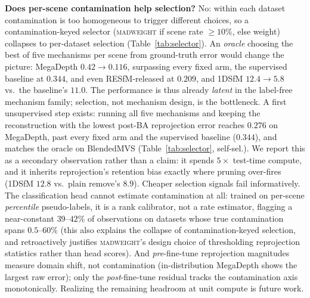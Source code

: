 \documentclass[10pt,twocolumn,letterpaper]{article}
\newcommand{\mad}{\textsc{madweight}}
\begin{document}
\noindent\textbf{Does per-scene contamination help selection?} No: within each dataset
contamination is too homogeneous to trigger different choices, so a contamination-keyed
selector (\mad{} if scene rate ${\ge}10\%$, else weight) collapses to per-dataset
selection (Table~\ref{tab:selector}). An \emph{oracle} choosing the best of five
mechanisms per scene from ground-truth error would change the picture: MegaDepth
$0.42\!\to\!0.116$, surpassing every fixed arm, the supervised baseline at $0.344$,
and even RESfM-released at $0.209$, and 1DSfM $12.4\!\to\!5.8$ vs.\ the
baseline's $11.0$. The performance is thus already \emph{latent} in the label-free mechanism family;
selection, not mechanism design, is the bottleneck. A first unsupervised step exists:
running all five mechanisms and keeping the reconstruction with the lowest post-BA
reprojection error reaches $0.276$ on MegaDepth, past every fixed arm and the supervised
baseline ($0.344$), and matches the oracle on BlendedMVS (Table~\ref{tab:selector},
self-sel.). We report this as a secondary observation rather than a claim: it spends
$5\times$ test-time compute, and it inherits reprojection's retention bias exactly where
pruning over-fires (1DSfM $12.8$ vs.\ plain remove's $8.9$). Cheaper selection signals
fail informatively. The classification head cannot estimate contamination at all:
trained on per-scene \emph{percentile} pseudo-labels, it is a rank calibrator, not a
rate estimator, flagging a near-constant $39$--$42\%$ of observations on datasets
whose true contamination spans $0.5$--$60\%$ (this also explains the collapse of
contamination-keyed selection, and retroactively justifies \mad{}'s design choice of
thresholding reprojection statistics rather than head scores). And \emph{pre}-fine-tune
reprojection magnitudes measure domain shift, not contamination (in-distribution
MegaDepth shows the largest raw error); only the \emph{post}-fine-tune residual tracks
the contamination axis monotonically. Realizing the remaining headroom at unit compute
is future work.
\end{document}
